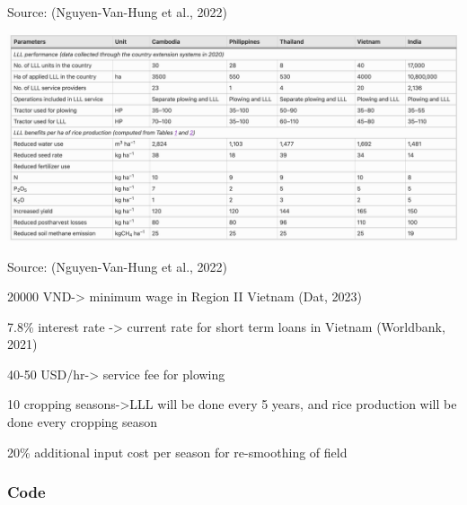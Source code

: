 \documentclass[
]{article}
\begin{document}
Source: (Nguyen-Van-Hung et al., 2022)

\includegraphics{images/Screenshot 2023-06-16 at 12.29.18 PM.png}

Source: (Nguyen-Van-Hung et al., 2022)

20000 VND-\textgreater{} minimum wage in Region II Vietnam (Dat, 2023)

7.8\% interest rate -\textgreater{} current rate for short term loans in
Vietnam (Worldbank, 2021)

40-50 USD/hr-\textgreater{} service fee for plowing

10 cropping seasons-\textgreater LLL will be done every 5 years, and
rice production will be done every cropping season

20\% additional input cost per season for re-smoothing of field

\hypertarget{code}{%
\subsubsection{Code}\label{code}}
\end{document}

